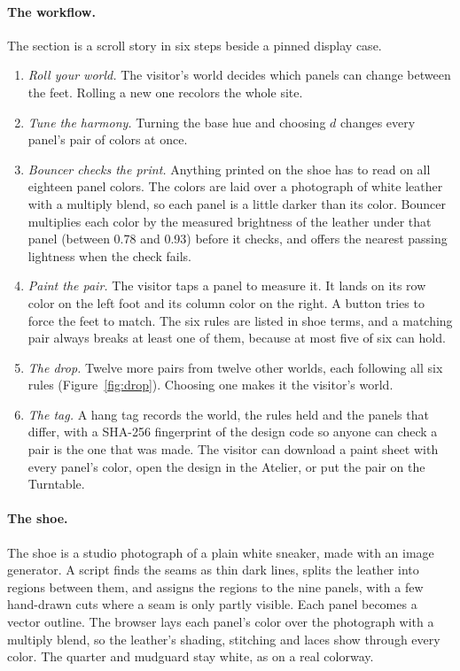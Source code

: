 \documentclass[11pt,a4paper]{article}
\theoremstyle{qresult}
\begin{document}
\paragraph{The workflow.} The section is a scroll story in six steps beside a pinned display case.
\begin{enumerate}
  \item \emph{Roll your world.} The visitor's world decides which panels can change between the feet. Rolling a new
        one recolors the whole site.
  \item \emph{Tune the harmony.} Turning the base hue and choosing $d$ changes every panel's pair of colors at once.
  \item \emph{Bouncer checks the print.} Anything printed on the shoe has to read on all eighteen panel colors. The
        colors are laid over a photograph of white leather with a multiply blend, so each panel is a little darker
        than its color. Bouncer multiplies each color by the measured brightness of the leather under that panel
        (between 0.78 and 0.93) before it checks, and offers the nearest passing lightness when the check fails.
  \item \emph{Paint the pair.} The visitor taps a panel to measure it. It lands on its row color on the left foot
        and its column color on the right. A button tries to force the feet to match. The six rules are listed in
        shoe terms, and a matching pair always breaks at least one of them, because at most five of six can hold.
  \item \emph{The drop.} Twelve more pairs from twelve other worlds, each following all six rules (Figure~\ref{fig:drop}).
        Choosing one makes it the visitor's world.
  \item \emph{The tag.} A hang tag records the world, the rules held and the panels that differ, with a SHA-256
        fingerprint of the design code so anyone can check a pair is the one that was made. The visitor can download
        a paint sheet with every panel's color, open the design in the Atelier, or put the pair on the Turntable.
\end{enumerate}


\paragraph{The shoe.} The shoe is a studio photograph of a plain white sneaker, made with an image generator. A script
finds the seams as thin dark lines, splits the leather into regions between them, and assigns the regions to the
nine panels, with a few hand-drawn cuts where a seam is only partly visible. Each panel becomes a vector outline. The
browser lays each panel's color over the photograph with a multiply blend, so the leather's shading, stitching and
laces show through every color. The quarter and mudguard stay white, as on a real colorway.
\end{document}
